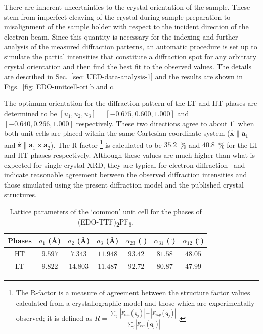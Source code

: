 There are inherent uncertainties to the crystal orientation of the sample.
These stem from imperfect cleaving of the crystal during sample preparation
to misalignment of the sample holder with respect to the incident direction of the electron beam.
%
Since this quantity is necessary for the indexing and further analysis of the measured diffraction patterns,
an automatic procedure is set up to simulate the partial intensities that constitute a diffraction spot
for any arbitrary crystal orientation and then find the best fit to the observed values.
%
The details are described in Sec.~\ref{sec: UED-data-analysis-1} and
the results are shown in Figs.~\ref{fig: EDO-unitcell-ori}b and c.

The optimum orientation for the diffraction pattern of the LT and HT phases
are determined to be $[ u_1, u_2, u_3 ] = [-0.675, 0.600, 1.000]$ and
$[-0.640, 0.266, 1.000]$ respectively.
%
These two directions agree to about $1^\circ$ when both unit cells are placed
within the same Cartesian coordinate system ($\hat{\boldsymbol{x}} \parallel \boldsymbol{a}_1$
and $\hat{\boldsymbol{z}} \parallel \boldsymbol{a}_1 \times \boldsymbol{a}_2$).
%
The R-factor%
\footnote{The R-factor is a measure of agreement between the structure factor values
calculated from a crystallographic model and those which are experimentally observed;
it is defined as
$R = \frac{\sum \limits _j \left| |F_\text{sim}(\boldsymbol{q}_j)| - |F_\text{exp}(\boldsymbol{q}_j)| \right|}{\sum \limits _j \left| F_\text{exp}(\boldsymbol{q}_j) \right|}$.}
is calculated to be $35.2$~\% and $40.8$~\% for the LT and HT phases respectively.
Although these values are much higher than what is expected for single-crystal XRD,
they are typical for electron diffraction~\cite{ZouBook} and indicate reasonable agreement
between the observed diffraction intensities and those simulated using the present diffraction model
and the published crystal structures.

\begin{table}[ht!]
  \centering
  {\renewcommand{\arraystretch}{1.5}
  \begin{tabular}{ c c c c c c c }
    \toprule
    Phases & $a_1$ (\AA)  & $a_2$ (\AA)  & $a_3$ (\AA)  & $\alpha_{23}$ ($^{\circ}$) & $\alpha_{31}$ ($^{\circ}$) & $\alpha_{12}$ ($^{\circ}$) \\
    \midrule
    HT & $9.597$ & $7.343$ & $11.948$ & $93.42$ & $81.58$ & $48.05$ \\
    LT & $9.822$ & $14.803$ & $11.487$ & $92.72$ & $80.87$ & $47.99$ \\
    \bottomrule
  \end{tabular}
  }
  \caption{Lattice parameters of the `common' unit cell for the phases of (EDO-TTF)\textsubscript{2}PF\textsubscript{6}.}
  \label{tab: EDO-unitcell}
\end{table}


